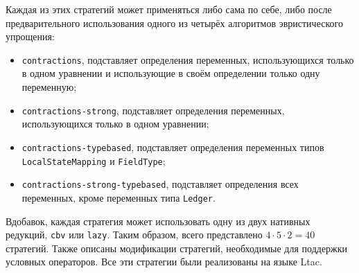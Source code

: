 \documentclass[../diploma.tex]{subfiles}
\begin{document}
Каждая из этих стратегий может применяться либо сама по себе, либо после предварительного использования одного из четырёх алгоритмов эвристического упрощения:
\begin{itemize}
    \item \texttt{contractions}, подставляет определения переменных, использующихся только в одном уравнении и использующие в своём определении только одну переменную;
    \item \texttt{contractions-strong}, подставляет определения переменных, использующихся только в одном уравнении;
    \item \texttt{contractions-typebased}, подставляет определения переменных типов\\\texttt{LocalStateMapping} и \texttt{FieldType};
    \item \texttt{contractions-strong-typebased}, подставляет определения всех переменных, кроме переменных типа \texttt{Ledger}.
\end{itemize}

Вдобавок, каждая стратегия может использовать одну из двух нативных редукций, \texttt{cbv} или \texttt{lazy}. Таким образом, всего представлено $4 \cdot 5 \cdot 2 = 40$ стратегий. Также описаны модификации стратегий, необходимые для поддержки условных операторов. Все эти стратегии были реализованы на языке Ltac.
\end{document}
